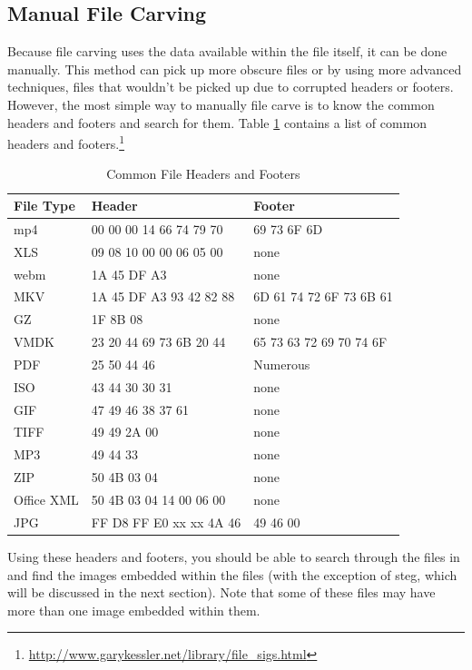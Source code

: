 \documentclass[a4paper,11pt]{report}
\begin{document}
		\subsection{Manual File Carving}
			Because file carving uses the data available within the file itself, it can be done manually. 
			This method can pick up more obscure files or by using more advanced techniques, files that wouldn't be picked up due to corrupted headers or footers. 
			However, the most simple way to manually file carve is to know the common headers and footers and search for them. 
			Table \ref{tab:FileCarvingHeaders} contains a list of common headers and footers.\footnote{\url{http://www.garykessler.net/library/file\_sigs.html}} 
			\begin{table}[htb]
				\centering
				\begin{tabular}{| l | l | l |}
					\hline
					\textbf{File Type} & \textbf{Header} & \textbf{Footer} \\ \hline
					mp4	& 00 00 00 14 66 74 79 70	& 69 73 6F 6D \\ \hline
					XLS	& 09 08 10 00 00 06 05 00	& none \\ \hline
					webm& 1A 45 DF A3				& none \\ \hline
					MKV & 1A 45 DF A3 93 42 82 88	& 6D 61 74 72 6F 73 6B 61 \\ \hline
					GZ	& 1F 8B 08					& none \\ \hline
					VMDK& 23 20 44 69 73 6B 20 44	& 65 73 63 72 69 70 74 6F \\ \hline
					PDF & 25 50 44 46				& Numerous \\ \hline
					ISO	& 43 44 30 30 31			& none \\ \hline
					GIF & 47 49 46 38 37 61			& none \\ \hline
					TIFF& 49 49 2A 00				& none \\ \hline
					MP3	& 49 44 33					& none \\ \hline
					ZIP & 50 4B 03 04				& none \\ \hline
					Office XML & 50 4B 03 04 14 00 06 00 & none \\ \hline
					JPG & FF D8 FF E0 xx xx 4A 46	& 49 46 00 \\ \hline
				\end{tabular}
				\caption{Common File Headers and Footers}
				\label{tab:FileCarvingHeaders}
			\end{table}
			Using these headers and footers, you should be able to search through the files in  %
			and find the images embedded within the files (with the exception of steg, which will be discussed in the next section).
			Note that some of these files may have more than one image embedded within them. 
\end{document}
